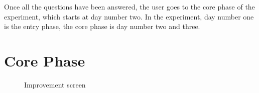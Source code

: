 Once all the questions have been answered, the user goes to the core phase of the experiment, which starts at day number two. In the experiment, day number one is the entry phase, the core phase is day number two and three.

\section{Core Phase} \label{core}


\begin{figure}[htp]
  \hspace{1em}
  \caption{Improvement screen}
  \label{fig:imp}
\end{figure}


